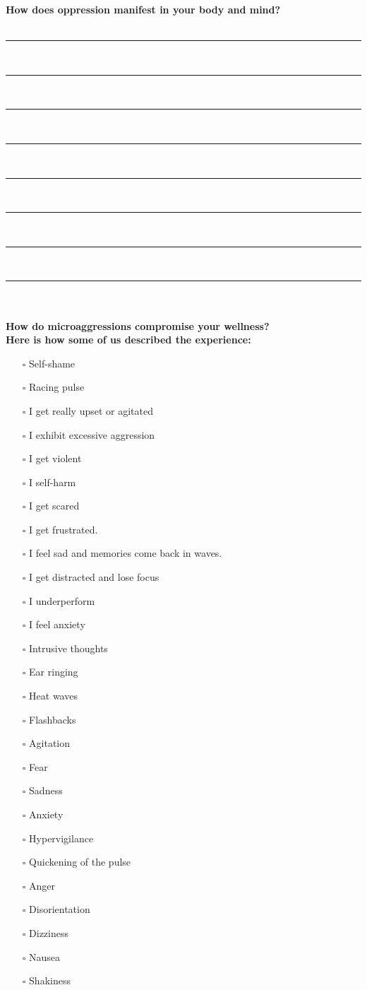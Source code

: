 \newpage
\noindent
\textcolor{ProcessBlue}{\textbf{\Large{How does oppression manifest in your body and mind?}}}\\\\
\noindent\rule{\textwidth}{1pt}\\
\noindent\rule{\textwidth}{1pt}\\
\noindent\rule{\textwidth}{1pt}\\
\noindent\rule{\textwidth}{1pt}\\
\noindent\rule{\textwidth}{1pt}\\
\noindent\rule{\textwidth}{1pt}\\
\noindent\rule{\textwidth}{1pt}\\
\noindent\rule{\textwidth}{1pt}\\\\

\noindent\textcolor{ProcessBlue}{\textbf{\Large{How do microaggressions compromise your wellness?}}}\\
\textbf{\large{Here is how some of us described the experience:}}
\begin{multicols}{2}
\begin{itemize}
\item[$\square$]{Self-shame}
\item[$\square$]{Racing pulse}
\item[$\square$]{I get really upset or agitated}
\item[$\square$]{I exhibit excessive aggression}
\item[$\square$]{I get violent}
\item[$\square$]{I self-harm}
\item[$\square$]{I get scared}
\item[$\square$]{I get frustrated.}
\item[$\square$]{I feel sad and memories come back in waves.}
\item[$\square$]{I get distracted and lose focus}
\item[$\square$]{I underperform}
\item[$\square$]{I feel anxiety}
\item[$\square$]{Intrusive thoughts}
\item[$\square$]{Ear ringing}
\item[$\square$]{Heat waves}
\item[$\square$]{Flashbacks}
\item[$\square$]{Agitation}
\item[$\square$]{Fear}
\item[$\square$]{Sadness}
\item[$\square$]{Anxiety}
\item[$\square$]{Hypervigilance}
\item[$\square$]{Quickening of the pulse}
\item[$\square$]{Anger}
\item[$\square$]{Disorientation}
\item[$\square$]{Dizziness}
\item[$\square$]{Nausea}
\item[$\square$]{Shakiness}
\end{itemize}
\end{multicols}


